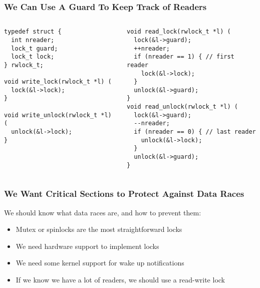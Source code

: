   \begin{frame}[fragile]
    \frametitle{We Can Use A Guard To Keep Track of Readers}

    \begin{columns}
      \begin{column}{0.5\textwidth}
        \begin{lstlisting}
typedef struct {
  int nreader;
  lock_t guard;
  lock_t lock;
} rwlock_t;

void write_lock(rwlock_t *l) (
  lock(&l->lock);
}

void write_unlock(rwlock_t *l) (
  unlock(&l->lock);
}
        \end{lstlisting}
      \end{column}
      \begin{column}{0.5\textwidth}
        \begin{lstlisting}
void read_lock(rwlock_t *l) (
  lock(&l->guard);
  ++nreader;
  if (nreader == 1) { // first reader
    lock(&l->lock);
  }
  unlock(&l->guard);
}
void read_unlock(rwlock_t *l) (
  lock(&l->guard);
  --nreader;
  if (nreader == 0) { // last reader
    unlock(&l->lock);
  }
  unlock(&l->guard);
}
        \end{lstlisting}
      \end{column}
    \end{columns}
  \end{frame}

  \begin{frame}
    \frametitle{We Want Critical Sections to Protect Against Data Races}

    We should know what data races are, and how to prevent them:
    \begin{itemize}
      \item Mutex or spinlocks are the most straightforward locks
      \item We need hardware support to implement locks
      \item We need some kernel support for wake up notifications
      \item If we know we have a lot of readers, we should use a read-write lock
    \end{itemize}
  \end{frame}

